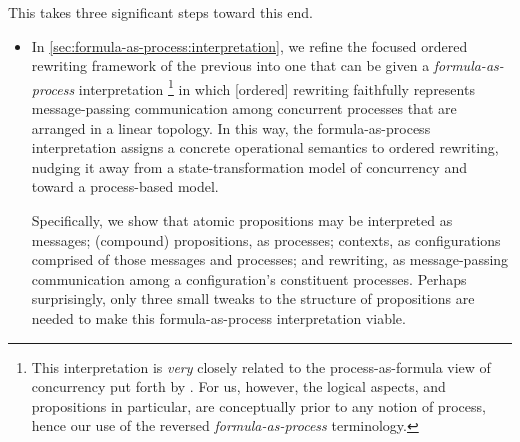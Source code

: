 This  takes three significant steps toward this end.
\begin{itemize}[listparindent=\parindent, itemsep=\dimexpr\itemsep+\parsep\relax, parsep=0pt]
\item
  In \cref{sec:formula-as-process:interpretation}, we refine the focused ordered rewriting framework of the previous  into one that can be given a \emph{formula-as-process} interpretation%
  \footnote{This interpretation is \emph{very} closely related to the process-as-formula view of concurrency put forth by \textcites{Miller:??}{Cervesato+Scedrov:IC09}.
    For us, however, the logical aspects, and propositions in particular, are conceptually prior to any notion of process, hence our use of the reversed \emph{formula-as-process} terminology.}
  in which [ordered] rewriting faithfully represents message-passing communication among concurrent processes that are arranged in a linear topology.
  In this way, the formula-as-process interpretation assigns a concrete operational semantics to ordered rewriting, nudging it away from a state-transformation model of concurrency and toward a process-based model.

  Specifically, we show that atomic propositions may be interpreted as messages;
  (compound) propositions, as processes;
  contexts, as configurations comprised of those messages and processes;
  and
  rewriting, as mes\-sage-passing communication among a configuration's con\-stit\-u\-ent processes.
  Perhaps surprisingly, only three small tweaks to the structure of propositions are needed to make this formula-as-process interpretation viable.





\end{itemize}

